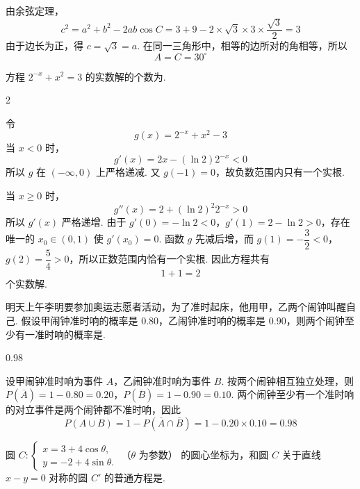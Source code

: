 \begin{solution}
由余弦定理，
\[
c^2=a^2+b^2-2ab\cos C
=3+9-2\times\sqrt{3}\times3\times\frac{\sqrt{3}}{2}
=3
\]
由于边长为正，得 \(c=\sqrt{3}=a\). 在同一三角形中，相等的边所对的角相等，所以
\[
A=C=30^{\circ}
\]
\end{solution}

\begin{problem}
方程 \(2^{-x} + x^{2} = 3\) 的实数解的个数为\fillinblank{}.
\end{problem}

\begin{answer}
2
\end{answer}

\begin{solution}
令
\[
g(x)=2^{-x}+x^2-3
\]
当 \(x<0\) 时，
\[
g'(x)=2x-(\ln2)2^{-x}<0
\]
所以 \(g\) 在 \((-\infty,0)\) 上严格递减. 又 \(g(-1)=0\)，故负数范围内只有一个实根.

当 \(x\geqslant0\) 时，
\[
g''(x)=2+(\ln2)^2 2^{-x}>0
\]
所以 \(g'(x)\) 严格递增. 由于 \(g'(0)=-\ln2<0\)，\(g'(1)=2-\ln2>0\)，存在唯一的 \(x_0\in(0,1)\) 使 \(g'(x_0)=0\). 函数 \(g\) 先减后增，而 \(g(1)=-\dfrac{3}{2}<0\)，\(g(2)=\dfrac{5}{4}>0\)，所以正数范围内恰有一个实根. 因此方程共有
\[
1+1=2
\]
个实数解.
\end{solution}

\begin{problem}
明天上午李明要参加奥运志愿者活动，为了准时起床，他用甲，乙两个闹钟叫醒自己. 假设甲闹钟准时响的概率是 0.80，乙闹钟准时响的概率是 0.90，则两个闹钟至少有一准时响的概率是\fillinblank{}.
\end{problem}

\begin{answer}
0.98
\end{answer}

\begin{solution}
设甲闹钟准时响为事件 \(A\)，乙闹钟准时响为事件 \(B\). 按两个闹钟相互独立处理，则
\(P(\overline{A})=1-0.80=0.20\)，\(P(\overline{B})=1-0.90=0.10\).
两个闹钟至少有一个准时响的对立事件是两个闹钟都不准时响，因此
\[
P(A\cup B)
=1-P(\overline{A}\cap\overline{B})
=1-0.20\times0.10
=0.98
\]
\end{solution}

\begin{problem}
圆 \(C: \begin{cases}
x = 3 + 4\cos \theta,\\
y = -2 + 4\sin \theta.
\end{cases}\) （\(\theta\) 为参数） 的圆心坐标为\fillinblank{}，和圆 \(C\) 关于直线 \(x - y = 0\) 对称的圆 \(C'\) 的普通方程是\fillinblank{}.
\end{problem}

